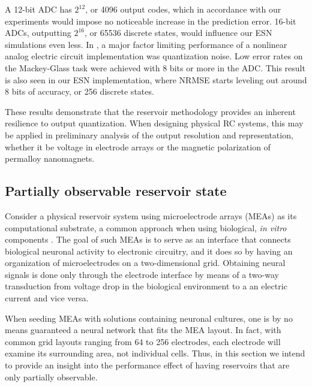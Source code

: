 A 12-bit ADC has $2^{12}$, or 4096 output codes, which in accordance with our
experiments would impose no noticeable increase in the prediction error. 16-bit
ADCs, outputting $2^{16}$, or 65536 discrete states, would influence our ESN
simulations even less. In \cite{soriano_delay-based_2015}, a major factor
limiting performance of a nonlinear analog electric circuit implementation was
quantization noise. Low error rates on the Mackey-Glass task were achieved with
8 bits or more in the ADC. This result is also seen in our ESN implementation,
where NRMSE starts leveling out around 8 bits of accuracy, or 256 discrete
states.

These results demonstrate that the reservoir methodology provides an inherent
resilience to output quantization. When designing physical RC systems, this may
be applied in preliminary analysis of the output resolution and representation,
whether it be voltage in electrode arrays or the magnetic polarization of
permalloy nanomagnets.



\subsection{Partially observable reservoir state}

Consider a physical reservoir system using microelectrode arrays (MEAs) as its
computational substrate, a common approach when using biological, \textit{in
vitro} components \cite{aaser_towards_2017}. The goal of such MEAs is to serve
as an interface that connects biological neuronal activity to electronic
circuitry, and it does so by having an organization of microelectrodes on a
two-dimensional grid. Obtaining neural signals is done only through the
electrode interface by means of a two-way transduction from voltage drop in the
biological environment to a an electric current and vice versa.

When seeding MEAs with solutions containing neuronal cultures, one is by no
means guaranteed a neural network that fits the MEA layout. In fact, with common
grid layouts ranging from 64 to 256 electrodes, each electrode will examine its
surrounding area, not individual cells. Thus, in this section we intend to
provide an insight into the performance effect of having reservoirs that are
only partially observable.

